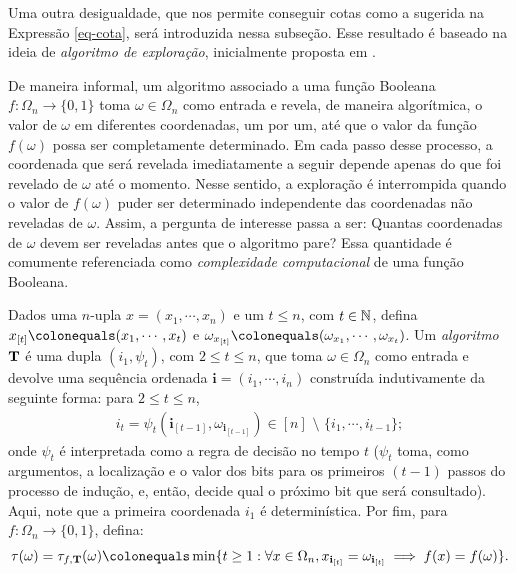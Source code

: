 \par Uma outra desigualdade, que nos permite conseguir cotas como a sugerida na Expressão \eqref{eq-cota}, será introduzida nessa subseção. Esse resultado é baseado na ideia de \textit{algoritmo de exploração}, inicialmente proposta em \cite{yao1977probabilistic}.

\par De maneira informal, um algoritmo associado a uma função Booleana $f: \Omega_n \longrightarrow \{0,1\}$ toma $\omega \in \Omega_n$ como entrada e revela, de maneira algorítmica, o valor de $\omega$ em diferentes coordenadas, um por um, até que o valor da função $f(\omega)$ possa ser completamente determinado. Em cada passo desse processo, a coordenada que será revelada imediatamente a seguir depende apenas do que foi revelado de $\omega$ até o momento. Nesse sentido, a exploração é interrompida quando o valor de $f(\omega)$ puder ser determinado independente das coordenadas não reveladas de $\omega$. Assim, a pergunta de interesse passa a ser: Quantas coordenadas de $\omega$ devem ser reveladas antes que o algoritmo pare? Essa quantidade é comumente referenciada como \textit{complexidade computacional} de uma função Booleana.

\begin{mydef}\label{def-algoritmo}
	Dados uma $n$-upla $x = (x_1, \cdots, x_n)$ e um $t \leq n$, com $t \in \operatorname{\mathbb{N}}$, defina $x_{[t]} \colonequals (x_1, \cdots, x_t)$ e $\omega_{x_{[t]}} \colonequals (\omega_{x_1}, \cdots, \omega_{x_t})$. Um \textit{algoritmo} $\text{\textbf{T}}$ é uma dupla $(i_1, \psi_t)$, com $2 \leq t \leq n$, que toma $\omega \in \Omega_n$ como entrada e devolve uma sequência ordenada $\textbf{i} = (i_1, \cdots, i_n)$ construída indutivamente da seguinte forma: para $2 \leq t \leq n$,
	\begin{align*}
		i_t = \psi_t(\mathbf{i}_{[t-1]}, \omega_{\mathbf{i}_{[t-1]}}) \in [n] \text{~\textbackslash~} \{i_1, \cdots, i_{t-1}\};
	\end{align*}
	onde $\psi_t$ é interpretada como a regra de decisão no tempo $t$ ($\psi_t$ toma, como argumentos, a localização e o valor dos bits para os primeiros $(t-1)$ passos do processo de indução, e, então, decide qual o próximo bit que será consultado). Aqui, note que a primeira coordenada $i_1$ é determinística. Por fim, para $f:\Omega_n \longrightarrow \{0,1\}$, defina:
	\begin{align*}
		\tau(\omega) = \tau_{f, \text{\textbf{T}}}(\omega) \colonequals \min\{t \geq 1: \forall x \in \Omega_n, x_{\mathbf{i}_{[t]}} = \omega_{\mathbf{i}_{[t]}} \implies f(x) = f(\omega)\}.
	\end{align*}
\end{mydef}

